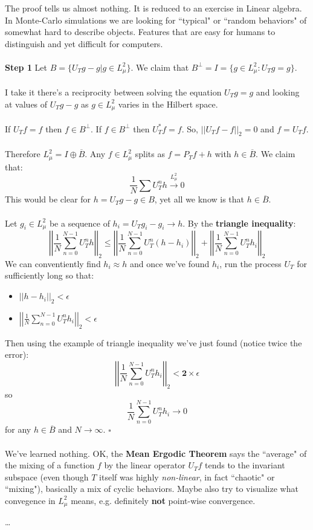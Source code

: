 \documentclass[12pt]{article}
\begin{document}
The proof tells us almost nothing.  It is reduced to an exercise in Linear algebra. In Monte-Carlo simulations we are looking for ``typical" or ``random behaviors" of somewhat hard to describe objects.  Features that are easy for humans to distinguish and yet difficult for computers.\\ \\
\textbf{Step 1} Let $B = \{ U_Tg - g | g \in L^2_\mu  \} $.  We claim that $B^\perp = I = \{ g \in L^2_\mu : U_T g= g  \}$. \\ \\
I take it there's a reciprocity between solving the equation $U_T g = g$ and looking at values of $U_T g - g$ as $g \in L_\mu^2$ varies in the Hilbert space. \\ \\
If $U_T f = f $ then $f \in B^\perp$. If $f \in B^\perp$ then $U_T^* f = f$.  So, $||U_T f - f||_2 = 0$ and $f = U_T f$.  \\ \\ 
Therefore $L^2_\mu = I \oplus \overline{B} $.  Any $f \in L^2_\mu$ splits as $f = P_T f + h $ with $h \in \overline{B}$. We claim that:
$$ \frac{1}{N} \sum U^n_T  h \stackrel{L^2_\mu}{\to} 0 $$
This would be clear for $h = U_T g - g \in B$, yet all we know is that $h \in \overline{B}$. \\ \\
Let $g_i \in L_\mu^2$ be a sequence of $h_i = U_T g_i - g_i \to h$.  By the \textbf{triangle inequality}:
$$ \left|\left| \frac{1}{N} \sum^{N-1}_{n=0} U_T^n h \right|\right|_2 \leq 
\left|\left| \frac{1}{N} \sum^{N-1}_{n=0} U_T^n (h-h_i) \right|\right|_2 + 
\left|\left| \frac{1}{N} \sum^{N-1}_{n=0} U_T^n h_i \right|\right|_2$$
We can conventiently find $h_i \approx h$ and once we've found $h_i$, run the process $U_T$ for sufficiently long so that:
\begin{itemize}
\item $\displaystyle ||h - h_i||_2 < \epsilon $
\item $\displaystyle \left|\left|\frac{1}{N} \sum_{n = 0}^{N-1} U_T^n h_i\right|\right|_2 < \epsilon $
\end{itemize}
Then using the example of triangle inequality we've just found (notice twice the error):
$$ \left|\left|\frac{1}{N} \sum_{n = 0}^{N-1} U_T^n h_i\right|\right|_2 < \mathbf{2} \times \epsilon  $$
so
$$ \frac{1}{N} \sum_{n = 0}^{N-1} U_T^n h_i \to 0  $$
for any $h \in \overline{B}$ and $N \to \infty$.  \hfill $\square$ \\ \\
We've learned nothing.  OK, the \textbf{Mean Ergodic Theorem} says the ``average" of the mixing of a function $f$ by the linear operator $U_T f$ tends to the invariant subspace  (even though $T$ itself was highly \textit{non-linear}, in fact ``chaotic" or ``mixing"), basically a mix of cyclic behaviors.  Maybe also try to visualize what convegence in $L^2_\mu$ means, e.g. definitely \textbf{not} point-wise convergence.    
\begin{thebibliography}{}

\item  \dots 

\end{thebibliography}
\end{document}
